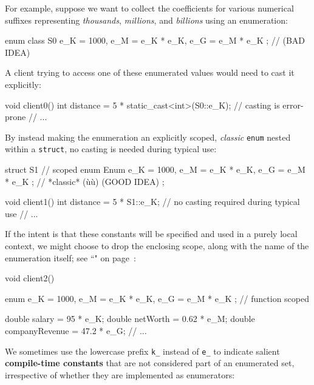 For example, suppose we want to collect the coefficients for various
numerical suffixes representing \emph{thousands}, \emph{millions}, and
\emph{billions} using an enumeration:

\begin{emcppslisting}[emcppsbatch=e13]
enum class S0 { e_K = 1000, e_M = e_K * e_K, e_G = e_M * e_K };  // (BAD IDEA)
\end{emcppslisting}

\noindent A client trying to access one of these enumerated values would need to
cast it explicitly:

\begin{emcppslisting}[emcppsbatch=e13]
void client0()
{
    int distance = 5 * static_cast<int>(S0::e_K);  // casting is error-prone
    // ...
}
\end{emcppslisting}

\noindent By instead making the enumeration an explicitly scoped, \emph{classic}
\texttt{enum} nested within a \texttt{struct}, no casting is needed
during typical use:

\begin{emcppslisting}
struct S1  // scoped
{
    enum Enum { e_K = 1000, e_M = e_K * e_K, e_G = e_M * e_K };
        // *classic* (ù{}ù) (GOOD IDEA)
};

void client1()
{
    int distance = 5 * S1::e_K;  // no casting required during typical use
    // ...
}
\end{emcppslisting}

\noindent If the intent is that these constants will be specified and used in a
purely local context, we might choose to drop the enclosing scope, along
with the name of the enumeration itself; see ``" on page~\pageref{local-types-as-template-arguments}:

\begin{emcppslisting}
void client2()
{
    enum { e_K = 1000, e_M = e_K * e_K, e_G = e_M * e_K };  // function scoped

    double salary = 95 * e_K;
    double netWorth = 0.62 * e_M;
    double companyRevenue = 47.2 * e_G;
    // ...
}
\end{emcppslisting}

\noindent We sometimes use the
lowercase prefix \texttt{k\_} instead of \texttt{e\_} to indicate
salient \textbf{compile-time constants} that are not considered part
of an enumerated set, irrespective of whether they are implemented as
enumerators:

